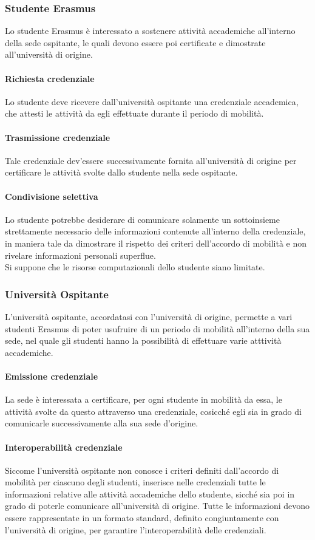 \documentclass[a4paper,12pt]{article}
\begin{document}
\subsubsection{Studente Erasmus}
Lo studente Erasmus è interessato a sostenere attività accademiche all'interno della sede ospitante, le quali devono essere poi certificate e dimostrate all'università di origine.
\paragraph{Richiesta credenziale} Lo studente deve ricevere dall'università ospitante una credenziale accademica, che attesti le attività da egli effettuate durante il periodo di mobilità.
\paragraph{Trasmissione credenziale} Tale credenziale dev'essere successivamente fornita all'università di origine per certificare le attività svolte dallo studente nella sede ospitante. 
\paragraph{Condivisione selettiva} Lo studente potrebbe desiderare di comunicare solamente un sottoinsieme strettamente necessario delle informazioni contenute all'interno della credenziale, in maniera tale da dimostrare il rispetto dei criteri dell'accordo di mobilità e non rivelare informazioni personali superflue.
\\[0.5em] Si suppone che le risorse computazionali dello studente siano limitate. 

\subsubsection{Università Ospitante}
L'università ospitante, accordatasi con l'università di origine, permette a vari studenti Erasmus di poter usufruire di un periodo di mobilità all'interno della sua sede, nel quale gli studenti hanno la possibilità di effettuare varie atttività accademiche.
\paragraph{Emissione credenziale} La sede è interessata a certificare, per ogni studente in mobilità da essa, le attività svolte da questo attraverso una credenziale, cosicché egli sia in grado di comunicarle successivamente alla sua sede d'origine.
\paragraph{Interoperabilità credenziale} Siccome l'università ospitante non conosce i criteri definiti dall'accordo di mobilità per ciascuno degli studenti, inserisce nelle credenziali tutte le informazioni relative alle attività accademiche dello studente, sicché sia poi in grado di poterle comunicare all'università di origine. Tutte le informazioni devono essere rappresentate in un formato standard, definito congiuntamente con l'università di origine, per garantire l'interoperabilità delle credenziali.
\end{document}
